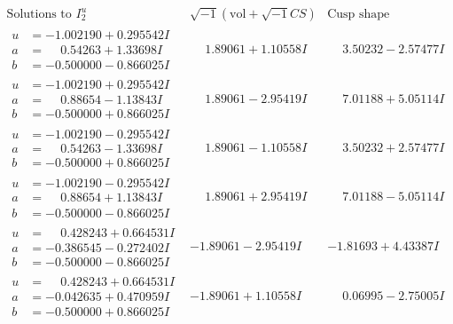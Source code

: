 \documentclass[1p]{elsarticle_modified}
\theoremstyle{definition}
\newcommand{\I}{\sqrt{-1}}
\begin{document}
$$\begin{array}{c|c|c}  
\text{Solutions to }I^u_{2}& \I (\text{vol} + \sqrt{-1}CS) & \text{Cusp shape}\\
 \hline 
\begin{aligned}
u &= -1.002190 + 0.295542 I \\
a &= \phantom{-}0.54263 + 1.33698 I \\
b &= -0.500000 - 0.866025 I\end{aligned}
 & \phantom{-}1.89061 + 1.10558 I & \phantom{-}3.50232 - 2.57477 I \\ \hline\begin{aligned}
u &= -1.002190 + 0.295542 I \\
a &= \phantom{-}0.88654 - 1.13843 I \\
b &= -0.500000 + 0.866025 I\end{aligned}
 & \phantom{-}1.89061 - 2.95419 I & \phantom{-}7.01188 + 5.05114 I \\ \hline\begin{aligned}
u &= -1.002190 - 0.295542 I \\
a &= \phantom{-}0.54263 - 1.33698 I \\
b &= -0.500000 + 0.866025 I\end{aligned}
 & \phantom{-}1.89061 - 1.10558 I & \phantom{-}3.50232 + 2.57477 I \\ \hline\begin{aligned}
u &= -1.002190 - 0.295542 I \\
a &= \phantom{-}0.88654 + 1.13843 I \\
b &= -0.500000 - 0.866025 I\end{aligned}
 & \phantom{-}1.89061 + 2.95419 I & \phantom{-}7.01188 - 5.05114 I \\ \hline\begin{aligned}
u &= \phantom{-}0.428243 + 0.664531 I \\
a &= -0.386545 - 0.272402 I \\
b &= -0.500000 - 0.866025 I\end{aligned}
 & -1.89061 - 2.95419 I & -1.81693 + 4.43387 I \\ \hline\begin{aligned}
u &= \phantom{-}0.428243 + 0.664531 I \\
a &= -0.042635 + 0.470959 I \\
b &= -0.500000 + 0.866025 I\end{aligned}
 & -1.89061 + 1.10558 I & \phantom{-}0.06995 - 2.75005 I \\ \hline\begin{aligned}

\end{aligned}
\end{array}$$
\end{document}

